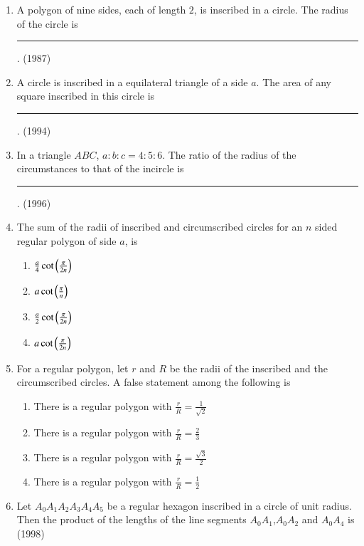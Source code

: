 \begin{enumerate}[label=\thesubsection.\arabic*,ref=\thesubsection.\theenumi]
    \item A polygon of nine sides, each of length $2$, is inscribed in a circle. The radius of the circle is \rule{1cm}{0.1pt}. \hfill (1987) 
    \item A circle is inscribed in a equilateral triangle of a side $a$. The area of any square inscribed in this circle is \rule{1cm}{0.1pt}. \hfill (1994)  
    \item In a triangle $ABC$, $a:b:c = 4:5:6$. The ratio of the radius of the circumstances to that of the incircle is \rule{1cm}{0.1pt}. \hfill (1996) 
        \item The sum of the radii of inscribed and circumscribed circles for an $n$ sided regular polygon of side $a$, is \hfill{}
\begin{multicols}{4}
\begin{enumerate}
        \item $\frac{a}{4} \cot{\ensuremath{\left(\frac{\pi}{2n}\right)}}$         
        \item $ a \cot{\ensuremath{\left(\frac{\pi}{n}\right)}}$ 
        \item $\frac{a}{2} \cot{\ensuremath{\left(\frac{\pi}{2n}\right)}}$ 
        \item $ a \cot{\ensuremath{\left(\frac{\pi}{2n}\right)}}$
\end{enumerate}
\end{multicols}
\item For a regular polygon, let $r$ and $R$ be the radii of the inscribed and the circumscribed circles. A false statement among the following is \hfill{}
\begin{enumerate}
        \item There is a regular polygon with $\frac{r}{R}=\frac{1}{\sqrt{2}}$                    
        \item There is a regular polygon with $\frac{r}{R}=\frac{2}{3}$ 
        \item There is a regular polygon with $\frac{r}{R}=\frac{\sqrt{3}}{2}$ 
        \item There is a regular polygon with $\frac{r}{R}=\frac{1}{2}$
\end{enumerate}
    \item Let $A_{0}A_{1}A_{2}A_{3}A_{4}A_{5}$ be a regular hexagon inscribed in a circle of unit radius. Then the product of the lengths of the line segments $A_{0}A_{1}$,$A_{0}A_{2}$ and $A_{0}A_{4}$ is 
    \hfill{(1998)}
    \begin{multicols}{4}

\end{multicols}
\end{enumerate}
